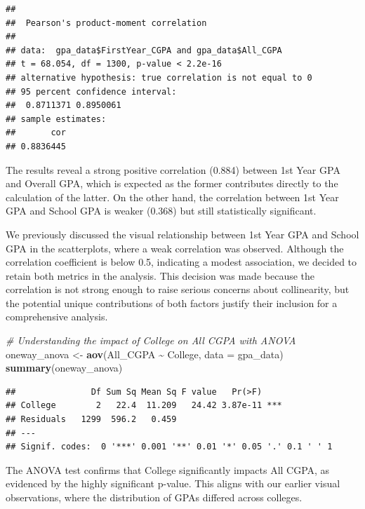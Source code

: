 \documentclass[
  12pt,
]{article}
\newenvironment{Shaded}{\begin{snugshade}}{\end{snugshade}}
\newcommand{\AttributeTok}[1]{\textcolor[rgb]{0.13,0.29,0.53}{#1}}
\newcommand{\CommentTok}[1]{\textcolor[rgb]{0.56,0.35,0.01}{\textit{#1}}}
\newcommand{\FunctionTok}[1]{\textcolor[rgb]{0.13,0.29,0.53}{\textbf{#1}}}
\newcommand{\NormalTok}[1]{#1}
\newcommand{\OtherTok}[1]{\textcolor[rgb]{0.56,0.35,0.01}{#1}}
\newcommand{\SpecialCharTok}[1]{\textcolor[rgb]{0.81,0.36,0.00}{\textbf{#1}}}
\begin{document}
\begin{verbatim}
## 
##  Pearson's product-moment correlation
## 
## data:  gpa_data$FirstYear_CGPA and gpa_data$All_CGPA
## t = 68.054, df = 1300, p-value < 2.2e-16
## alternative hypothesis: true correlation is not equal to 0
## 95 percent confidence interval:
##  0.8711371 0.8950061
## sample estimates:
##       cor 
## 0.8836445
\end{verbatim}

The results reveal a strong positive correlation (0.884) between 1st
Year GPA and Overall GPA, which is expected as the former contributes
directly to the calculation of the latter. On the other hand, the
correlation between 1st Year GPA and School GPA is weaker (0.368) but
still statistically significant.

We previously discussed the visual relationship between 1st Year GPA and
School GPA in the scatterplots, where a weak correlation was observed.
Although the correlation coefficient is below 0.5, indicating a modest
association, we decided to retain both metrics in the analysis. This
decision was made because the correlation is not strong enough to raise
serious concerns about collinearity, but the potential unique
contributions of both factors justify their inclusion for a
comprehensive analysis.

\begin{Shaded}
\begin{Highlighting}[]
\CommentTok{\# Understanding the impact of College on All CGPA with ANOVA}
\NormalTok{oneway\_anova }\OtherTok{\textless{}{-}} \FunctionTok{aov}\NormalTok{(All\_CGPA }\SpecialCharTok{\textasciitilde{}}\NormalTok{ College, }\AttributeTok{data =}\NormalTok{ gpa\_data)}
\FunctionTok{summary}\NormalTok{(oneway\_anova)}
\end{Highlighting}
\end{Shaded}

\begin{verbatim}
##               Df Sum Sq Mean Sq F value   Pr(>F)    
## College        2   22.4  11.209   24.42 3.87e-11 ***
## Residuals   1299  596.2   0.459                     
## ---
## Signif. codes:  0 '***' 0.001 '**' 0.01 '*' 0.05 '.' 0.1 ' ' 1
\end{verbatim}

The ANOVA test confirms that College significantly impacts All CGPA, as
evidenced by the highly significant p-value. This aligns with our
earlier visual observations, where the distribution of GPAs differed
across colleges.
\end{document}
